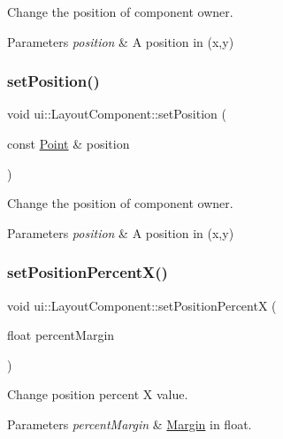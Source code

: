 Change the position of component owner. 
\begin{DoxyParams}{Parameters}
{\em position} & A position in (x,y) \\
\hline
\end{DoxyParams}
\mbox{\label{classui_1_1LayoutComponent_ac965de551371d6087f29d3bcfccb11d9}} 
\subsubsection{\texorpdfstring{set\+Position()}{setPosition()}\hspace{0.1cm}{\footnotesize\ttfamily [2/2]}}
{\footnotesize\ttfamily void ui\+::\+Layout\+Component\+::set\+Position (\begin{DoxyParamCaption}\item[{const \hyperlink{classVec2}{Point} \&}]{position }\end{DoxyParamCaption})}

Change the position of component owner. 
\begin{DoxyParams}{Parameters}
{\em position} & A position in (x,y) \\
\hline
\end{DoxyParams}
\mbox{\label{classui_1_1LayoutComponent_a4461080a849760acbc7f9435e34286b9}} 
\subsubsection{\texorpdfstring{set\+Position\+Percent\+X()}{setPositionPercentX()}\hspace{0.1cm}{\footnotesize\ttfamily [1/2]}}
{\footnotesize\ttfamily void ui\+::\+Layout\+Component\+::set\+Position\+PercentX (\begin{DoxyParamCaption}\item[{float}]{percent\+Margin }\end{DoxyParamCaption})}

Change position percent X value. 
\begin{DoxyParams}{Parameters}
{\em percent\+Margin} & \hyperlink{classui_1_1Margin}{Margin} in float. \\
\hline
\end{DoxyParams}
\mbox{\label{classui_1_1LayoutComponent_a4461080a849760acbc7f9435e34286b9}} 
